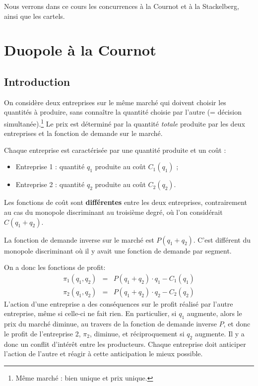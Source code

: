 \documentclass[
]{book}
\providecommand{\tightlist}{%
  \setlength{\itemsep}{0pt}\setlength{\parskip}{0pt}}
\theoremstyle{definition}
\theoremstyle{definition}
\theoremstyle{definition}
\theoremstyle{definition}
\theoremstyle{remark}
\begin{document}
Nous verrons dans ce cours les concurrences à la Cournot et à la Stackelberg, ainsi que les cartels.

\hypertarget{duopole-uxe0-la-cournot}{%
\section{Duopole à la Cournot}\label{duopole-uxe0-la-cournot}}

\hypertarget{introduction}{%
\subsection{Introduction}\label{introduction}}

On considère deux entreprises sur le même marché qui doivent choisir les quantités à produire, sans connaître la quantité choisie par l'autre (= décision simultanée).\footnote{Même marché : bien unique et prix unique.}
Le prix est déterminé par la quantité \emph{totale} produite par les deux entreprises et la fonction de demande sur le marché.

Chaque entreprise est caractérisée par une quantité produite et un coût :

\begin{itemize}
\tightlist
\item
  Entreprise 1 : quantité \(q_1\) produite au coût \(C_1(q_1)\) ;
\item
  Entreprise 2 : quantité \(q_2\) produite au coût \(C_2(q_2)\).
\end{itemize}

Les fonctions de coût sont \textbf{différentes} entre les deux entreprises, contrairement au cas du monopole discriminant au troisième degré, où l'on considérait \(C(q_1+q_2)\).

La fonction de demande inverse sur le marché est \(P(q_1+q_2)\).
C'est différent du monopole discriminant où il y avait une fonction de demande par segment.

On a donc les fonctions de profit:
\[
\begin{array}{rcl}
\pi_1(q_1, q_2) &=& P(q_1+q_2)\cdot q_1-C_1(q_1)\\
\pi_2(q_1, q_2) &=& P(q_1+q_2)\cdot q_2-C_2(q_2)
\end{array}
\]
L'action d'une entreprise a des conséquences sur le profit réalisé par l'autre entreprise, même si celle-ci ne fait rien.
En particulier, si \(q_1\) augmente, alors le prix du marché diminue, au travers de la fonction de demande inverse \(P\), et donc le profit de l'entreprise 2, \(\pi_2\), diminue, et réciproquement si \(q_2\) augmente.
Il y a donc un conflit d'intérêt entre les producteurs.
Chaque entreprise doit anticiper l'action de l'autre et réagir à cette anticipation le mieux possible.
\end{document}
